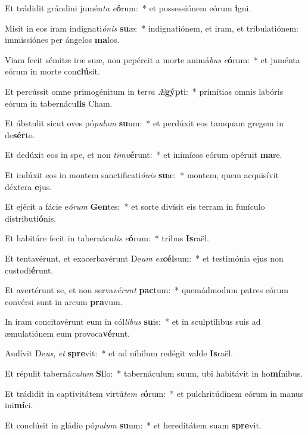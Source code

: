 \item Et trádidit grándini jumén\textit{ta} \textit{e}\textbf{ó}rum:~* et possessiónem eórum \textbf{i}gni.
\item Misit in eos iram indignati\textit{ó}\textit{nis} \textbf{su}æ:~* indignatiónem, et iram, et tribulatiónem: immissiónes per ángelos \textbf{ma}los.
\item Viam fecit sémitæ iræ suæ, non pepércit a morte animá\textit{bus} \textit{e}\textbf{ó}rum:~* et juménta eórum in morte con\textbf{clú}sit.
\item Et percússit omne primogénitum in ter\textit{ra} \textit{Æ}\textbf{gýp}ti:~* primítias omnis labóris eórum in tabernácu\textbf{lis} Cham.
\item Et ábstulit sicut oves pó\textit{pu}\textit{lum} \textbf{su}um:~* et perdúxit eos tamquam gregem in de\textbf{sér}to.
\item Et dedúxit eos in spe, et non \textit{ti}\textit{mu}\textbf{é}runt:~* et inimícos eórum opéruit \textbf{ma}re.
\item Et indúxit eos in montem sanctificati\textit{ó}\textit{nis} \textbf{su}æ:~* montem, quem acquisívit déxtera \textbf{e}jus.
\item Et ejécit a fácie e\textit{ó}\textit{rum} \textbf{Gen}tes:~* et sorte divísit eis terram in funículo distributi\textbf{ó}nis.
\item Et habitáre fecit in tabernácu\textit{lis} \textit{e}\textbf{ó}rum:~* tribus \textbf{Is}raël.
\item Et tentavérunt, et exacerbavérunt De\textit{um} \textit{ex}\textbf{cél}sum:~* et testimónia ejus non custodi\textbf{é}runt.
\item Et avertérunt se, et non serva\textit{vé}\textit{runt} \textbf{pac}tum:~* quemádmodum patres eórum convérsi sunt in arcum \textbf{pra}vum.
\item In iram concitavérunt eum in cól\textit{li}\textit{bus} \textbf{su}is:~* et in sculptílibus suis ad æmulatiónem eum provoca\textbf{vé}runt.
\item Audívit De\textit{us}, \textit{et} \textbf{spre}vit:~* et ad níhilum redégit valde \textbf{Is}raël.
\item Et répulit taberná\textit{cu}\textit{lum} \textbf{Si}lo:~* tabernáculum suum, ubi habitávit in ho\textbf{mí}nibus.
\item Et trádidit in captivitátem virtú\textit{tem} \textit{e}\textbf{ó}rum:~* et pulchritúdinem eórum in manus ini\textbf{mí}ci.
\item Et conclúsit in gládio pó\textit{pu}\textit{lum} \textbf{su}um:~* et hereditátem suam \textbf{spre}vit.
